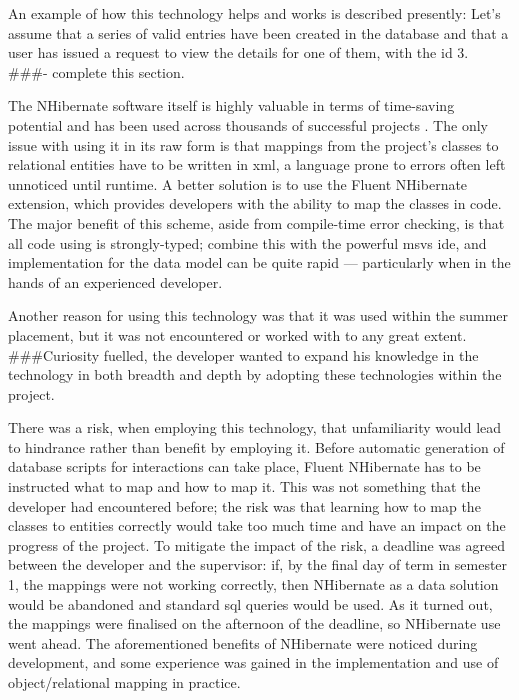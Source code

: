 \documentclass{l4proj}
\newcommand{\revisit}{\#\#\#}
\begin{document}
An example of how this technology helps and works is described presently: Let's assume that a series of valid entries have been created in the database and that a user has issued a request to view the details for one of them, with the \gls{id} 3. \revisit - complete this section.


The NHibernate software itself is highly valuable in terms of time-saving potential and has been used across thousands of successful projects \cite{NhUse}.  The only issue with using it in its raw form is that mappings from the project's classes to relational entities have to be written in \gls{xml}, a language prone to errors often left unnoticed until runtime.  A better solution is to use the Fluent NHibernate extension, which provides developers with the ability to map the classes in code.  The major benefit of this scheme, aside from compile-time error checking, is that all code using is strongly-typed; combine this with the powerful \gls{msvs} \gls{ide}, and implementation for the data model can be quite rapid --- particularly when in the hands of an experienced developer.

Another reason for using this technology was that it was used within the summer placement, but it was not encountered or worked with to any great extent.  \revisit Curiosity fuelled, the developer wanted to expand his knowledge in the technology in both breadth and depth by adopting these technologies within the project.

There was a risk, when employing this technology, that unfamiliarity would lead to hindrance rather than benefit by employing it.  Before automatic generation of database scripts for interactions can take place, Fluent NHibernate has to be instructed what to map and how to map it.  This was not something that the developer had encountered before; the risk was that learning how to map the classes to entities correctly would take too much time and have an impact on the progress of the project.  To mitigate the impact of the risk, a deadline was agreed between the developer and the supervisor: if, by the final day of term in semester 1, the mappings were not working correctly, then NHibernate as a data solution would be abandoned and standard \gls{sql} queries would be used.  As it turned out, the mappings were finalised on the afternoon of the deadline, so NHibernate use went ahead.  The aforementioned benefits of NHibernate were noticed during development, and some experience was gained in the implementation and use of object/relational mapping in practice.
\end{document}
